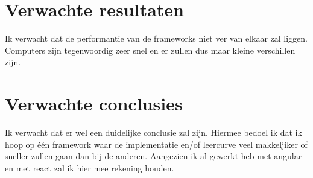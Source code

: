 \section{Verwachte resultaten}
\label{sec:verwachte_resultaten}

Ik verwacht dat de performantie van de frameworks niet ver van elkaar zal liggen. Computers zijn tegenwoordig zeer snel en er zullen dus maar kleine verschillen zijn.

\section{Verwachte conclusies}
\label{sec:verwachte_conclusies}

Ik verwacht dat er wel een duidelijke conclusie zal zijn. Hiermee bedoel ik dat ik hoop op één framework waar de implementatie en/of leercurve veel makkeljiker of sneller zullen gaan dan bij de anderen. Aangezien ik al gewerkt heb met angular en met react zal ik hier mee rekening houden.

